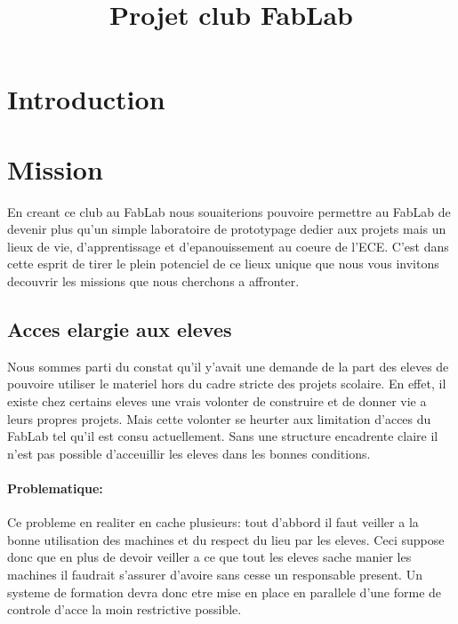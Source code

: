 \documentclass[12pt,a4paper]{article}
\title{Projet club FabLab}
\begin{document}
\section{Introduction}
\section{Mission}
En creant ce club au FabLab nous souaiterions pouvoire permettre au FabLab de devenir plus qu'un simple laboratoire de prototypage dedier aux projets mais un lieux de vie, d'apprentissage et d'epanouissement au coeure de l'ECE. C'est dans cette esprit de tirer le plein potenciel de ce lieux unique que nous vous invitons decouvrir les missions que nous cherchons a affronter. \\
\subsection{Acces elargie aux eleves}
Nous sommes parti du constat qu'il y'avait une demande de la part des eleves de pouvoire utiliser le materiel hors du cadre stricte des projets scolaire. En effet, il existe chez certains eleves une vrais volonter de construire et de donner vie a leurs propres projets. Mais cette volonter se heurter aux limitation d'acces du FabLab tel qu'il est consu actuellement. Sans une structure  encadrente claire il n'est pas possible d'acceuillir les eleves dans les bonnes conditions.\\
\paragraph{Problematique:}
Ce probleme en realiter en cache plusieurs: tout d'abbord il faut veiller a la bonne utilisation des machines et du respect du lieu par les eleves. Ceci suppose donc que en plus de devoir veiller a ce que tout les eleves sache manier les machines il faudrait s'assurer d'avoire sans cesse un responsable present. Un systeme de formation devra donc etre mise en place en parallele d'une forme de controle d'acce la moin restrictive possible.\\
\end{document}
